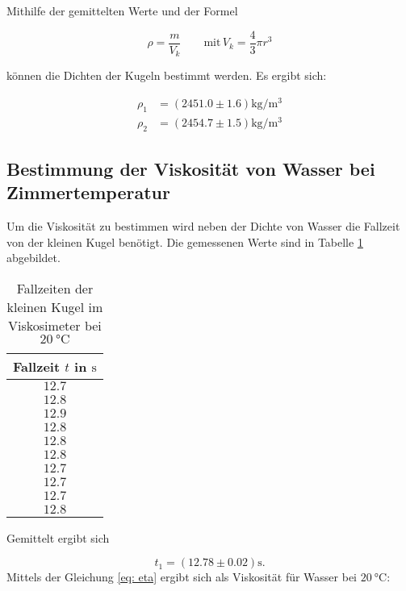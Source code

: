 Mithilfe der gemittelten Werte und der Formel

\begin{equation*}
\rho=\frac{m}{V_{k}} \qquad \text{mit} \, V_{k}=\frac{4}{3}\pi r^3
\end{equation*}

können die Dichten der Kugeln bestimmt werden.
Es ergibt sich:

\begin{align*}
\rho_{1}&=\left(\num{2451.0}\pm\num{1.6}\right) \si{\kilogram\per\cubic\meter}\\
\rho_{2}&=\left(\num{2454.7}\pm\num{1.5}\right) \si{\kilogram\per\cubic\meter}
\end{align*}

\subsection{Bestimmung der Viskosität von Wasser bei Zimmertemperatur}
Um die Viskosität zu bestimmen wird neben der Dichte von Wasser die Fallzeit von der kleinen Kugel benötigt.
Die gemessenen Werte sind in Tabelle \ref{tab:messwerte_fallzeit_kugel_klein} abgebildet. 
\begin{table}
\centering
\begin{tabular} {c}
	\toprule
  Fallzeit $t$ in $\si{\second}$ \\
  \midrule
  $\num{12.7}$ \\
  $\num{12.8}$ \\
  $\num{12.9}$ \\
  $\num{12.8}$ \\
  $\num{12.8}$ \\
  $\num{12.8}$ \\
  $\num{12.7}$ \\
  $\num{12.7}$ \\
  $\num{12.7}$ \\
  $\num{12.8}$ \\
\bottomrule
\end{tabular}
\caption{Fallzeiten der kleinen Kugel im Viskosimeter bei $\SI{20}{\degreeCelsius}$}
\label{tab:messwerte_fallzeit_kugel_klein}
\end{table}

Gemittelt ergibt sich

\begin{equation}
\label{eq:gemittelte_fallzeit_klein}
t_{1}=\left(\num{12.78}\pm\num{0.02}\right) \si{\second}.
\end{equation}
Mittels der Gleichung \ref{eq: eta} ergibt sich als Viskosität
für Wasser bei $\SI{20}{\degreeCelsius}$:


